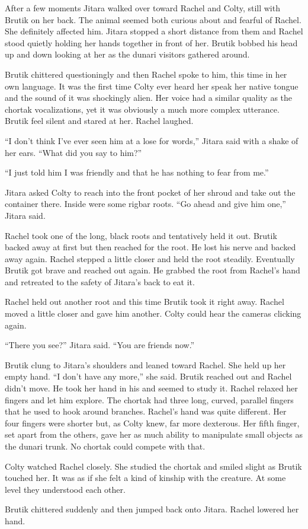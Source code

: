 After a few moments Jitara walked over toward Rachel and Colty, still with Brutik on her back.
The animal seemed both curious about and fearful of Rachel. She definitely affected him. Jitara
stopped a short distance from them and Rachel stood quietly holding her hands together in front
of her. Brutik bobbed his head up and down looking at her as the dunari visitors gathered
around.

Brutik chittered questioningly and then Rachel spoke to him, this time in her own language. It
was the first time Colty ever heard her speak her native tongue and the sound of it was
shockingly alien. Her voice had a similar quality as the chortak vocalizations, yet it was
obviously a much more complex utterance. Brutik feel silent and stared at her. Rachel laughed.

``I don't think I've ever seen him at a lose for words,'' Jitara said with a shake of her ears.
``What did you say to him?''

``I just told him I was friendly and that he has nothing to fear from me.''

Jitara asked Colty to reach into the front pocket of her shroud and take out the container
there. Inside were some rigbar roots. ``Go ahead and give him one,'' Jitara said.

Rachel took one of the long, black roots and tentatively held it out. Brutik backed away at
first but then reached for the root. He lost his nerve and backed away again. Rachel stepped a
little closer and held the root steadily. Eventually Brutik got brave and reached out again. He
grabbed the root from Rachel's hand and retreated to the safety of Jitara's back to eat it.

Rachel held out another root and this time Brutik took it right away. Rachel moved a little
closer and gave him another. Colty could hear the cameras clicking again.

``There you see?'' Jitara said. ``You are friends now.''

Brutik clung to Jitara's shoulders and leaned toward Rachel. She held up her empty hand. ``I
don't have any more,'' she said. Brutik reached out and Rachel didn't move. He took her hand in
his and seemed to study it. Rachel relaxed her fingers and let him explore. The chortak had
three long, curved, parallel fingers that he used to hook around branches. Rachel's hand was
quite different. Her four fingers were shorter but, as Colty knew, far more dexterous. Her fifth
finger, set apart from the others, gave her as much ability to manipulate small objects as the
dunari trunk. No chortak could compete with that.

Colty watched Rachel closely. She studied the chortak and smiled slight as Brutik touched her.
It was as if she felt a kind of kinship with the creature. At some level they understood each
other.

Brutik chittered suddenly and then jumped back onto Jitara. Rachel lowered her hand.
